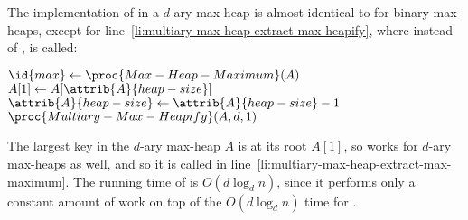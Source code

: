 The implementation of  in a $d$-ary max-heap is almost identical to  for binary max-heaps, except for line~\ref{li:multiary-max-heap-extract-max-heapify}, where instead of ,  is called:

\begin{codebox}
\li $\id{max}\gets\proc{Max-Heap-Maximum}(A)$ \label{li:multiary-max-heap-extract-max-maximum}
\li $A[1]\gets A[\attrib{A}{heap-size}]$
\li $\attrib{A}{heap-size}\gets\attrib{A}{heap-size}-1$
\li $\proc{Multiary-Max-Heapify}(A,d,1)$ \label{li:multiary-max-heap-extract-max-heapify}
\li \Return {}
\end{codebox}

The largest key in the $d$-ary max-heap $A$ is at its root $A[1]$, so  works for $d$-ary max-heaps as well, and so it is called in line~\ref{li:multiary-max-heap-extract-max-maximum}.
The running time of  is $O(d\log_dn)$, since it performs only a constant amount of work on top of the $O(d\log_dn)$ time for .
